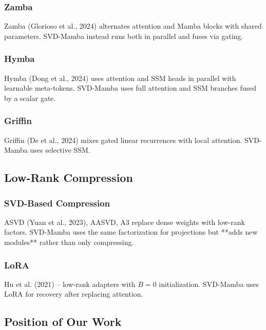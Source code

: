 \subsubsection{Zamba}

Zamba (Glorioso et al., 2024) alternates attention and Mamba blocks with 
shared parameters. SVD-Mamba instead runs both in parallel and fuses via 
gating.

\subsubsection{Hymba}

Hymba (Dong et al., 2024) uses attention and SSM heads in parallel with 
learnable meta-tokens. SVD-Mamba uses full attention and SSM branches 
fused by a scalar gate.

\subsubsection{Griffin}

Griffin (De et al., 2024) mixes gated linear recurrences with local 
attention. SVD-Mamba uses selective SSM.

\subsection{Low-Rank Compression}

\subsubsection{SVD-Based Compression}

ASVD (Yuan et al., 2023), AASVD, A3 replace dense weights with low-rank 
factors. SVD-Mamba uses the same factorization for projections but **adds 
new modules** rather than only compressing.

\subsubsection{LoRA}

Hu et al. (2021) -- low-rank adapters with $B=0$ initialization. SVD-Mamba 
uses LoRA for recovery after replacing attention.

\subsection{Position of Our Work}

